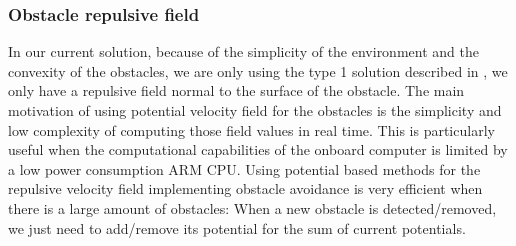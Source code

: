 \subsubsection{Obstacle repulsive field}
In our current solution, because of the simplicity of the environment and the convexity of the obstacles, we are only using the type 1 solution described in \cite{mcinnes2003velocity}, we only have a repulsive field normal to the surface of the obstacle.
The main motivation of using potential velocity field for the obstacles is the simplicity and low complexity of computing those field values in real time. This is particularly useful when the computational capabilities of the onboard computer is limited by a low power consumption ARM CPU. 
Using potential based methods for the repulsive velocity field implementing obstacle avoidance is very efficient when there is a large amount of obstacles: When a new obstacle is detected/removed, we just need to add/remove its potential for the sum of current potentials.

